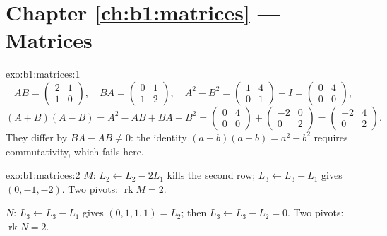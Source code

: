 \section*{Chapter \ref{ch:b1:matrices} --- Matrices}

\begin{solution}{exo:b1:matrices:1}
\[
AB = \begin{pmatrix} 2 & 1\\ 1 & 0\end{pmatrix},
\quad
BA = \begin{pmatrix} 0 & 1\\ 1 & 2\end{pmatrix},
\quad
A^2 - B^2 = \begin{pmatrix} 1 & 4\\ 0 & 1\end{pmatrix} - I
= \begin{pmatrix} 0 & 4\\ 0 & 0\end{pmatrix},
\]
\[
(A+B)(A-B) = A^2 - AB + BA - B^2
= \begin{pmatrix} 0 & 4\\ 0 & 0\end{pmatrix} +
\begin{pmatrix} -2 & 0\\ 0 & 2 \end{pmatrix}
= \begin{pmatrix} -2 & 4\\ 0 & 2\end{pmatrix}.
\]
They differ by $BA - AB \neq 0$: the identity $(a+b)(a-b) = a^2 -
b^2$ requires commutativity, which fails here.
\end{solution}

\begin{solution}{exo:b1:matrices:2}
$M$: $L_2 \leftarrow L_2 - 2L_1$ kills the second row; $L_3
\leftarrow L_3 - L_1$ gives $(0, -1, -2)$. Two pivots:
$\operatorname{rk} M = 2$.

$N$: $L_3 \leftarrow L_3 - L_1$ gives $(0,1,1,1) = L_2$; then $L_3
\leftarrow L_3 - L_2 = 0$. Two pivots: $\operatorname{rk} N = 2$.
\end{solution}

